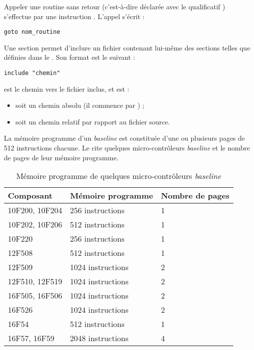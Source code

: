 Appeler une routine sans retour (c'est-à-dire déclarée avec le qualificatif ) s'effectue par une instruction . L'appel s'écrit :
\begin{lstlisting}[language=piccolo]
goto nom_routine
\end{lstlisting}





Une section  permet d'inclure un fichier contenant lui-même des sections telles que définies dans le .  Son format est le suivant :

\begin{lstlisting}[language=piccolo]
  include "chemin"
\end{lstlisting}

 est le chemin vers le fichier inclus, et est :
\begin{itemize}
  \item soit un chemin absolu (il commence par \piccolo{/}) ;
  \item soit un chemin relatif par rapport au fichier source.
\end{itemize}


La mémoire programme d'un \emph{baseline} est constituée d'une ou plusieurs pages de 512 instructions chacune. Le  cite quelques micro-contrôleurs \emph{baseline} et le nombre de pages de leur mémoire programme.

\begin{table}[!ht]
  \centering
  \small
  \begin{tabular}{lll}
    \textbf{Composant} & \textbf{Mémoire programme} & \textbf{Nombre de pages}\\
    \hline
    10F200, 10F204  & 256 instructions & 1\\
    \hdashline
    10F202, 10F206  & 512 instructions & 1\\
    \hdashline
    10F220  & 256 instructions & 1\\
    \hdashline
    12F508  & 512 instructions & 1\\
    \hdashline
    12F509  & 1024 instructions & 2\\
    \hdashline
    12F510, 12F519  & 1024 instructions & 2\\
    \hdashline
    16F505, 16F506  & 1024 instructions & 2\\
    \hdashline
    16F526 & 1024 instructions & 2\\
    \hdashline
    16F54  & 512 instructions & 1\\
    \hdashline
    16F57, 16F59  & 2048 instructions & 4\\
    \hline
  \end{tabular}
  \caption{Mémoire programme de quelques micro-contrôleurs \emph{baseline}}
\end{table}

